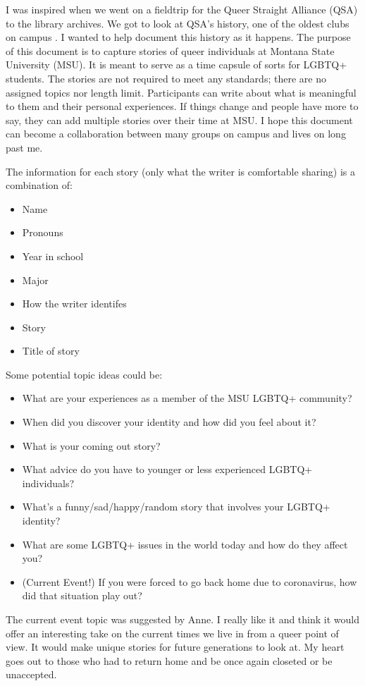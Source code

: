 I was inspired when we went on a fieldtrip for the Queer Straight Alliance 
(QSA) to the library archives. We got to look at QSA’s history, one of the 
oldest clubs on campus . I wanted to help document this history as it happens. The purpose of 
this document is to capture stories of queer individuals at Montana State 
University (MSU). It is meant to serve as a time capsule of sorts for LGBTQ+ 
students. The stories are not required to meet any standards; there are no 
assigned topics nor length limit. Participants can write about what is 
meaningful to them and their personal experiences. If things change and people
have more to say, they can add multiple stories over their time at MSU. I hope 
this document can become a collaboration between many groups on campus and 
lives on long past me.


The information for each story (only what the writer is comfortable sharing) is 
a combination of:
\begin{itemize}
    \item Name
    \item Pronouns
    \item Year in school
    \item Major
    \item How the writer identifes
    \item Story
    \item Title of story
\end{itemize}
Some potential topic ideas could be:
\begin{itemize}
    \item What are your experiences as a member of the MSU LGBTQ+ community?
    \item When did you discover your identity and how did you feel about it?
    \item What is your coming out story?
    \item What advice do you have to younger or less experienced LGBTQ+ 
        individuals?
    \item What’s a funny/sad/happy/random story that involves your LGBTQ+ 
        identity?
    \item What are some LGBTQ+ issues in the world today and how do they affect
        you?
    \item (Current Event!) If you were forced to go back home due to 
        coronavirus, how did that situation play out?
\end{itemize}

The current event topic was suggested by Anne. I really like it and think it 
would offer an interesting take on the current times we live in from a queer 
point of view. It would make unique stories for future generations to look at. 
My heart goes out to those who had to return home and be once again closeted or 
be unaccepted. 
